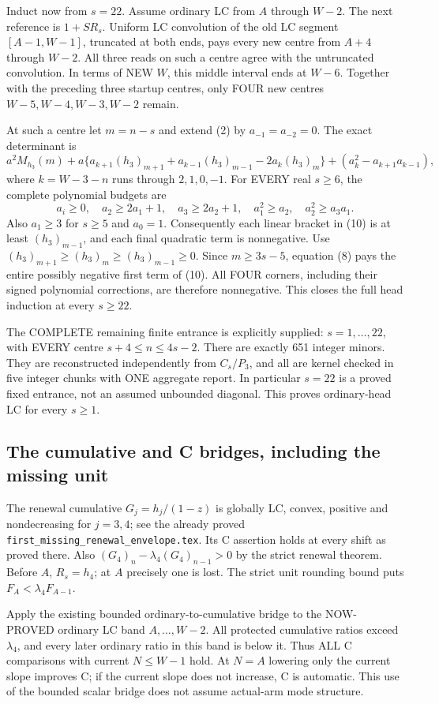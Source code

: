 Induct now from $s=22$. Assume ordinary LC from $A$ through $W-2$.
The next reference is $1+SR_s$. Uniform LC convolution of the old
LC segment $[A-1,W-1]$, truncated at both ends, pays every new centre
from $A+4$ through $W-2$. All three reads on such a centre agree with
the untruncated convolution. In terms of NEW $W$, this middle interval
ends at $W-6$. Together with the preceding three startup centres,
only FOUR new centres $W-5,W-4,W-3,W-2$ remain.

At such a centre let $m=n-s$ and extend (2) by $a_{-1}=a_{-2}=0$.
The exact determinant is
\[
 a^2M_{h_3}(m)+a\{a_{k+1}(h_3)_{m+1}
       +a_{k-1}(h_3)_{m-1}-2a_k(h_3)_m\}
                    +(a_k^2-a_{k+1}a_{k-1}),             \tag{10}
\]
where $k=W-3-n$ runs through $2,1,0,-1$.
For EVERY real $s\ge6$, the complete polynomial budgets are
\[
 a_i\ge0,\quad a_2\ge2a_1+1,\quad a_3\ge2a_2+1,
 \quad a_1^2\ge a_2,\quad a_2^2\ge a_3a_1.
\]
Also $a_1\ge3$ for $s\ge5$ and $a_0=1$.
Consequently each linear bracket in (10) is at least
$(h_3)_{m-1}$, and each final quadratic term is nonnegative.
Use $(h_3)_{m+1}\ge(h_3)_m\ge(h_3)_{m-1}\ge0$.
Since $m\ge3s-5$, equation (8) pays the entire possibly negative
first term of (10). All FOUR corners, including their signed polynomial
corrections, are therefore nonnegative. This closes the full head
induction at every $s\ge22$.

The COMPLETE remaining finite entrance is explicitly supplied:
$s=1,\ldots,22$, with EVERY centre $s+4\le n\le4s-2$.
There are exactly 651 integer minors. They are reconstructed independently
from $C_s/P_3$, and all are kernel checked in five integer chunks with
ONE aggregate report. In particular $s=22$ is a proved fixed entrance,
not an assumed unbounded diagonal. This proves ordinary-head LC for
every $s\ge1$.

\subsection{The cumulative and C bridges, including the missing unit}
The renewal cumulative $G_j=h_j/(1-z)$ is globally LC, convex,
positive and nondecreasing for $j=3,4$; see the already proved
\texttt{first\_missing\_renewal\_envelope.tex}. Its C assertion holds
at every shift as proved there. Also
$(G_4)_n-\lambda_4(G_4)_{n-1}>0$ by the strict renewal theorem.
Before $A$, $R_s=h_4$; at $A$ precisely one is lost. The strict unit
rounding bound puts $F_A<\lambda_4F_{A-1}$.

Apply the existing bounded ordinary-to-cumulative bridge to the
NOW-PROVED ordinary LC band $A,\ldots,W-2$. All protected cumulative
ratios exceed $\lambda_4$, and every later ordinary ratio in this
band is below it. Thus ALL C comparisons with current $N\le W-1$
hold. At $N=A$ lowering only the current slope improves C; if the
current slope does not increase, C is automatic. This use of the
bounded scalar bridge does not assume actual-arm mode structure.

